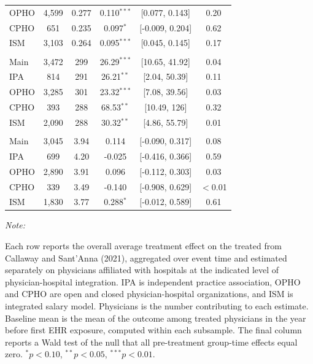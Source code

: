 \begin{table}[!h]
\begin{threeparttable}
\begin{tabular}[t]{lccccc}
\hspace{1em}\quad OPHO & 4,599 & 0.277 & 0.110$^{***}$ & {}[0.077, 0.143] & 0.20\\
\hspace{1em}\quad CPHO & 651 & 0.235 & 0.097$^{*}$ & {}[-0.009, 0.204] & 0.62\\
\hspace{1em}\quad ISM & 3,103 & 0.264 & 0.095$^{***}$ & {}[0.045, 0.145] & 0.17\\
\addlinespace[0.3em]
\multicolumn{6}{l}{\textbf{Number Patients}}\\
\hspace{1em}\quad Main & 3,472 & 299 & 26.29$^{***}$ & {}[10.65, 41.92] & 0.04\\
\hspace{1em}\quad IPA & 814 & 291 & 26.21$^{**}$ & {}[2.04, 50.39] & 0.11\\
\hspace{1em}\quad OPHO & 3,285 & 301 & 23.32$^{***}$ & {}[7.08, 39.56] & 0.03\\
\hspace{1em}\quad CPHO & 393 & 288 & 68.53$^{**}$ & {}[10.49, 126] & 0.32\\
\hspace{1em}\quad ISM & 2,090 & 288 & 30.32$^{**}$ & {}[4.86, 55.79] & 0.01\\
\addlinespace[0.3em]
\multicolumn{6}{l}{\textbf{Claims per Patient}}\\
\hspace{1em}\quad Main & 3,045 & 3.94 & 0.114 & {}[-0.090, 0.317] & 0.08\\
\hspace{1em}\quad IPA & 699 & 4.20 & -0.025 & {}[-0.416, 0.366] & 0.59\\
\hspace{1em}\quad OPHO & 2,890 & 3.91 & 0.096 & {}[-0.112, 0.303] & 0.03\\
\hspace{1em}\quad CPHO & 339 & 3.49 & -0.140 & {}[-0.908, 0.629] & $<$0.01\\
\hspace{1em}\quad ISM & 1,830 & 3.77 & 0.288$^{*}$ & {}[-0.012, 0.589] & 0.61\\
\bottomrule
\end{tabular}
\begin{tablenotes}
\item \textit{Note: } 
\item Each row reports the overall average treatment effect on the treated from Callaway and Sant'Anna (2021), aggregated over event time and estimated separately on physicians affiliated with hospitals at the indicated level of physician-hospital integration. IPA is independent practice association, OPHO and CPHO are open and closed physician-hospital organizations, and ISM is integrated salary model. Physicians is the number contributing to each estimate. Baseline mean is the mean of the outcome among treated physicians in the year before first EHR exposure, computed within each subsample. The final column reports a Wald test of the null that all pre-treatment group-time effects equal zero. $^{*}p<0.10$, $^{**}p<0.05$, $^{***}p<0.01$.

\end{tablenotes}
\end{threeparttable}
\end{table}
